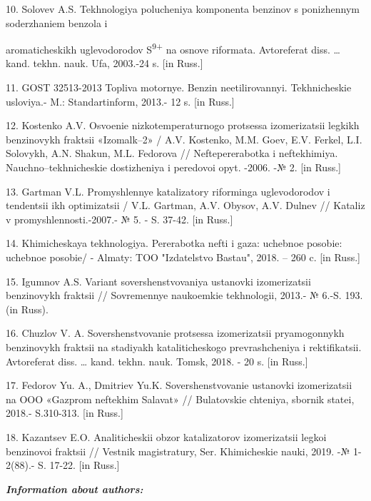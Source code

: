 \begin{noparindent}
10. Solov\textquotesingle ev A.S. Tekhnologiya polucheniya komponenta
benzinov s ponizhennym soderzhaniem benzola i

aromaticheskikh
uglevodorodov S\textsuperscript{9+} na osnove riformata. Avtoreferat
diss. \ldots{} kand. tekhn. nauk. Ufa, 2003.-24 s. {[}in Russ.{]}

11. GOST 32513-2013 Topliva motornye. Benzin neetilirovannyi.
Tekhnicheskie usloviya.- M.: Standartinform, 2013.- 12 s. {[}in Russ.{]}

12. Kostenko A.V. Osvoenie nizkotemperaturnogo protsessa izomerizatsii
legkikh benzinovykh fraktsii «Izomalk--2» / A.V. Kostenko, M.M. Goev,
E.V. Ferkel\textquotesingle, L.I. Solovykh, A.N. Shakun, M.L. Fedorova
// Neftepererabotka i neftekhimiya. Nauchno--tekhnicheskie dostizheniya
i peredovoi opyt. -2006. -№ 2. {[}in Russ.{]}

13. Gartman V.L. Promyshlennye katalizatory riforminga uglevodorodov i
tendentsii ikh optimizatsii / V.L. Gartman, A.V. Obysov, A.V.
Dul\textquotesingle nev // Kataliz v promyshlennosti.-2007.- № 5. - S.
37-42. {[}in Russ.{]}

14. Khimicheskaya tekhnologiya. Pererabotka nefti i gaza: uchebnoe
posobie: uchebnoe posobie/ - Almaty: TOO "Izdatel\textquotesingle stvo
Bastau", 2018. -- 260 c. {[}in Russ.{]}

15. Igumnov A.S. Variant sovershenstvovaniya ustanovki izomerizatsii
benzinovykh fraktsii // Sovremennye naukoemkie tekhnologii, 2013.- №
6.-S. 193. (in Russ).

16. Chuzlov V. A. Sovershenstvovanie protsessa izomerizatsii
pryamogonnykh benzinovykh fraktsii na stadiyakh kataliticheskogo
prevrashcheniya i rektifikatsii. Avtoreferat diss. \ldots{} kand. tekhn.
nauk. Tomsk, 2018. - 20 s. {[}in Russ.{]}

17. Fedorov Yu. A., Dmitriev Yu.K. Sovershenstvovanie ustanovki
izomerizatsii na OOO «Gazprom neftekhim Salavat» // Bulatovskie
chteniya, sbornik statei, 2018.- S.310-313. {[}in Russ.{]}

18. Kazantsev E.O. Analiticheskii obzor katalizatorov izomerizatsii
legkoi benzinovoi fraktsii // Vestnik magistratury, Ser. Khimicheskie
nauki, 2019. -№ 1-2(88).- S. 17-22. {[}in Russ.{]}
\end{noparindent}

\emph{{\bfseries Information about authors:}}

